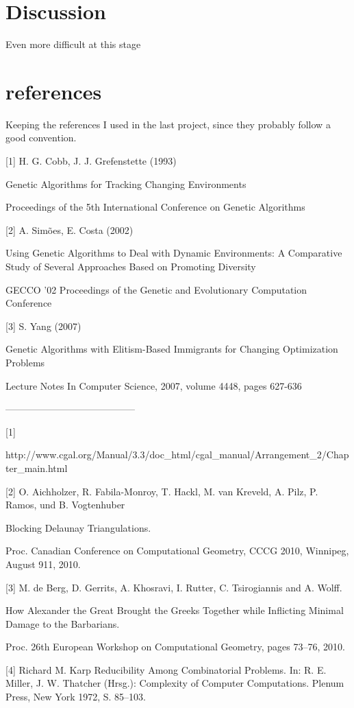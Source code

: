 \documentclass[a4paper,12pt]{article}
\begin{document}
\section{Discussion}
Even more difficult at this stage


\section{references}
Keeping the references I used in the last project, since they probably follow a good convention.

[1] H. G. Cobb, J. J. Grefenstette (1993)

Genetic Algorithms for Tracking Changing Environments

Proceedings of the 5th International Conference on Genetic Algorithms

[2] A. Simões, E. Costa (2002)

Using Genetic Algorithms to Deal with Dynamic Environments: A Comparative Study of Several Approaches Based on Promoting Diversity

GECCO '02 Proceedings of the Genetic and Evolutionary Computation Conference

[3] S. Yang (2007)

Genetic Algorithms with Elitism-Based Immigrants for Changing Optimization Problems

Lecture Notes In Computer Science, 2007, volume 4448, pages 627-636

-----------------------------------------

[1]

http://www.cgal.org/Manual/3.3/doc\_html/cgal\_manual/Arrangement\_2/Chapter\_main.html

[2] O. Aichholzer, R. Fabila-Monroy, T. Hackl, M. van Kreveld, A. Pilz, P. Ramos, und B. Vogtenhuber

Blocking Delaunay Triangulations. 

Proc. Canadian Conference on Computational Geometry, CCCG 2010, Winnipeg, August 9­11, 2010. 

[3] M. de Berg, D. Gerrits, A. Khosravi, I. Rutter, C. Tsirogiannis and A. Wolff.

How Alexander the Great Brought the Greeks Together while Inflicting Minimal Damage to the Barbarians.

Proc. 26th European Workshop on Computational Geometry, pages 73–76, 2010.

[4] Richard M. Karp
Reducibility Among Combinatorial Problems.
In: R. E. Miller, J. W. Thatcher (Hrsg.): Complexity of Computer Computations. Plenum Press, New York 1972, S. 85–103.
\end{document}

